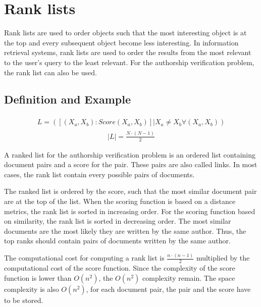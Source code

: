 \section{Rank lists}

Rank lists are used to order objects such that the most interesting object is at the top and every subsequent object become less interesting.
In information retrieval systems, rank lists are used to order the results from the most relevant to the user's query to the least relevant.
For the authorship verification problem, the rank list can also be used.

\subsection{Definition and Example}

\begin{definition}
  \begin{gather*}
      \begin{split}
        L = (\left[(X_a, X_b) : Score(X_a, X_b)\right] | X_a \neq X_b \forall (X_a, X_b))
      \end{split}
  \end{gather*}
  \begin{gather*}
    |L| = \frac{N \cdot (N - 1)}{2}
  \end{gather*}
\end{definition}

A ranked list for the authorship verification problem is an ordered list containing document pairs and a score for the pair.
These pairs are also called links.
In most cases, the rank list contain every possible pairs of documents.

The ranked list is ordered by the score, such that the most similar document pair are at the top of the list.
When the scoring function is based on a distance metrics, the rank list is sorted in increasing order.
For the scoring function based on similarity, the rank list is sorted in decreasing order.
The most similar documents are the most likely they are written by the same author.
Thus, the top ranks should contain pairs of documents written by the same author.

The computational cost for computing a rank list is $\frac{n \cdot (n - 1)}{2}$ multiplied by the computational cost of the score function.
Since the complexity of the score function is lower than $O(n^2)$, the $O(n^2)$ complexity remain.
The space complexity is also $O(n^2)$, for each document pair, the pair and the score have to be stored.


